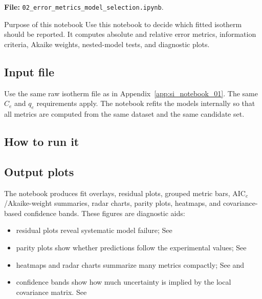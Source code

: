 \documentclass[journal=jacsat,manuscript=article]{achemso}
\begin{document}
\noindent\textbf{File:} \texttt{02\_error\_metrics\_model\_selection.ipynb}.

\begin{bluebox}{Purpose of this notebook}
	Use this notebook to decide which fitted isotherm should be reported.
	It computes absolute and relative error metrics, information criteria,
	Akaike weights, nested-model tests, and diagnostic plots.
\end{bluebox}

\subsection*{Input file}

Use the same raw isotherm file as in Appendix~\ref{app:si_notebook_01}.
The same \(C_e\) and \(q_e\) requirements apply. The notebook refits the
models internally so that all metrics are computed from the same dataset and
the same candidate set.

\subsection*{How to run it}


\subsection*{Output plots}

The notebook produces fit overlays, residual plots, grouped metric bars,
AIC$_c$/Akaike-weight summaries, radar charts, parity plots, heatmaps, and
covariance-based confidence bands. These figures are diagnostic aids:
\begin{itemize}
	\item residual plots reveal systematic model failure; See 
	\item parity plots show whether predictions follow the experimental values; See 
	\item heatmaps and radar charts summarize many metrics compactly; See  and 
	\item confidence bands show how much uncertainty is implied by the local covariance matrix. See 
\end{itemize}
\end{document}
